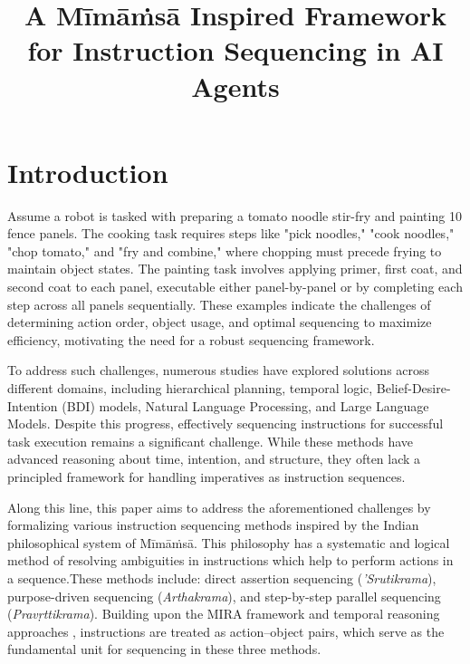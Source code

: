 \documentclass[a4paper,11pt]{lmcs}
\title{A M\={i}m\={a}\.{m}s\={a} Inspired Framework for Instruction Sequencing in AI Agents}
\author{}
\newcommand{\mimamsa}{M\={i}m\={a}\.ms\={a}}
\begin{document}
\maketitle

\begin{abstract}

\end{abstract}

\section{Introduction}
Assume a robot is tasked with preparing a tomato noodle stir-fry and painting 10 fence panels. The cooking task requires steps like "pick noodles," "cook noodles," "chop tomato," and "fry and combine," where chopping must precede frying to maintain object states. The painting task involves applying primer, first coat, and second coat to each panel, executable either panel-by-panel or by completing each step across all panels sequentially. These examples indicate the challenges of determining action order, object usage, and optimal sequencing to maximize efficiency, motivating the need for a robust sequencing framework.

To address such challenges, numerous studies have explored solutions across different domains, including hierarchical planning, temporal logic, Belief-Desire-Intention (BDI) models, Natural Language Processing, and Large Language Models. Despite this progress, effectively sequencing instructions for successful task execution remains a significant challenge. While these methods have advanced reasoning about time, intention, and structure, they often lack a principled framework for handling imperatives as instruction sequences.

Along this line, this paper aims to address the aforementioned challenges by formalizing various instruction sequencing methods inspired by the Indian philosophical system of \mimamsa. This philosophy has a systematic and logical method of resolving ambiguities in instructions which help to perform actions in a sequence.These methods include: direct assertion sequencing (\textit{'Srutikrama}), purpose-driven sequencing (\textit{Arthakrama}), and step-by-step parallel sequencing (\textit{Pravṛttikrama}). Building upon the MIRA framework \citep{mira} and temporal reasoning approaches \citep{llmmira}, instructions are treated as action–object pairs, which serve as the fundamental unit for sequencing in these three methods.
\end{document}
